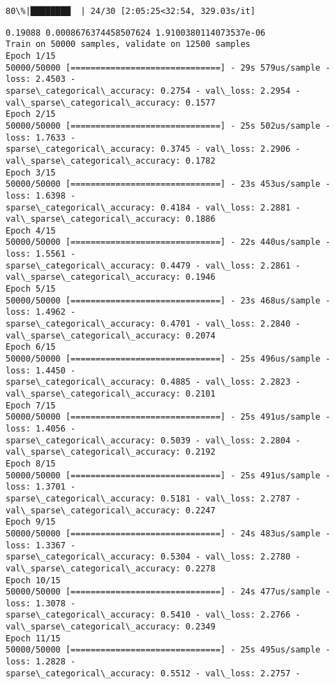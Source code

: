 \documentclass[11pt]{article}
\begin{document}
    \begin{Verbatim}[commandchars=\\\{\}]
 80\%|████████  | 24/30 [2:05:25<32:54, 329.03s/it]
    \end{Verbatim}

    \begin{Verbatim}[commandchars=\\\{\}]
0.19088 0.0008676374458507624 1.9100380114073537e-06
Train on 50000 samples, validate on 12500 samples
Epoch 1/15
50000/50000 [==============================] - 29s 579us/sample - loss: 2.4503 -
sparse\_categorical\_accuracy: 0.2754 - val\_loss: 2.2954 -
val\_sparse\_categorical\_accuracy: 0.1577
Epoch 2/15
50000/50000 [==============================] - 25s 502us/sample - loss: 1.7633 -
sparse\_categorical\_accuracy: 0.3745 - val\_loss: 2.2906 -
val\_sparse\_categorical\_accuracy: 0.1782
Epoch 3/15
50000/50000 [==============================] - 23s 453us/sample - loss: 1.6398 -
sparse\_categorical\_accuracy: 0.4184 - val\_loss: 2.2881 -
val\_sparse\_categorical\_accuracy: 0.1886
Epoch 4/15
50000/50000 [==============================] - 22s 440us/sample - loss: 1.5561 -
sparse\_categorical\_accuracy: 0.4479 - val\_loss: 2.2861 -
val\_sparse\_categorical\_accuracy: 0.1946
Epoch 5/15
50000/50000 [==============================] - 23s 468us/sample - loss: 1.4962 -
sparse\_categorical\_accuracy: 0.4701 - val\_loss: 2.2840 -
val\_sparse\_categorical\_accuracy: 0.2074
Epoch 6/15
50000/50000 [==============================] - 25s 496us/sample - loss: 1.4450 -
sparse\_categorical\_accuracy: 0.4885 - val\_loss: 2.2823 -
val\_sparse\_categorical\_accuracy: 0.2101
Epoch 7/15
50000/50000 [==============================] - 25s 491us/sample - loss: 1.4056 -
sparse\_categorical\_accuracy: 0.5039 - val\_loss: 2.2804 -
val\_sparse\_categorical\_accuracy: 0.2192
Epoch 8/15
50000/50000 [==============================] - 25s 491us/sample - loss: 1.3701 -
sparse\_categorical\_accuracy: 0.5181 - val\_loss: 2.2787 -
val\_sparse\_categorical\_accuracy: 0.2247
Epoch 9/15
50000/50000 [==============================] - 24s 483us/sample - loss: 1.3367 -
sparse\_categorical\_accuracy: 0.5304 - val\_loss: 2.2780 -
val\_sparse\_categorical\_accuracy: 0.2278
Epoch 10/15
50000/50000 [==============================] - 24s 477us/sample - loss: 1.3078 -
sparse\_categorical\_accuracy: 0.5410 - val\_loss: 2.2766 -
val\_sparse\_categorical\_accuracy: 0.2349
Epoch 11/15
50000/50000 [==============================] - 25s 495us/sample - loss: 1.2828 -
sparse\_categorical\_accuracy: 0.5512 - val\_loss: 2.2757 -

\end{Verbatim}
\end{document}
